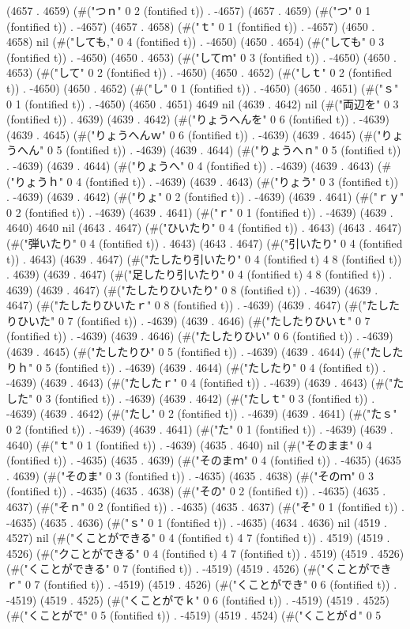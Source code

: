 (4657 . 4659) (#("つｎ" 0 2 (fontified t)) . -4657) (4657 . 4659) (#("つ" 0 1 (fontified t)) . -4657) (4657 . 4658) (#("ｔ" 0 1 (fontified t)) . -4657) (4650 . 4658) nil (#("しても," 0 4 (fontified t)) . -4650) (4650 . 4654) (#("しても" 0 3 (fontified t)) . -4650) (4650 . 4653) (#("してｍ" 0 3 (fontified t)) . -4650) (4650 . 4653) (#("して" 0 2 (fontified t)) . -4650) (4650 . 4652) (#("しｔ" 0 2 (fontified t)) . -4650) (4650 . 4652) (#("し" 0 1 (fontified t)) . -4650) (4650 . 4651) (#("ｓ" 0 1 (fontified t)) . -4650) (4650 . 4651) 4649 nil (4639 . 4642) nil (#("両辺を" 0 3 (fontified t)) . 4639) (4639 . 4642) (#("りょうへんを" 0 6 (fontified t)) . -4639) (4639 . 4645) (#("りょうへんｗ" 0 6 (fontified t)) . -4639) (4639 . 4645) (#("りょうへん" 0 5 (fontified t)) . -4639) (4639 . 4644) (#("りょうへｎ" 0 5 (fontified t)) . -4639) (4639 . 4644) (#("りょうへ" 0 4 (fontified t)) . -4639) (4639 . 4643) (#("りょうｈ" 0 4 (fontified t)) . -4639) (4639 . 4643) (#("りょう" 0 3 (fontified t)) . -4639) (4639 . 4642) (#("りょ" 0 2 (fontified t)) . -4639) (4639 . 4641) (#("ｒｙ" 0 2 (fontified t)) . -4639) (4639 . 4641) (#("ｒ" 0 1 (fontified t)) . -4639) (4639 . 4640) 4640 nil (4643 . 4647) (#("ひいたり" 0 4 (fontified t)) . 4643) (4643 . 4647) (#("弾いたり" 0 4 (fontified t)) . 4643) (4643 . 4647) (#("引いたり" 0 4 (fontified t)) . 4643) (4639 . 4647) (#("たしたり引いたり" 0 4 (fontified t) 4 8 (fontified t)) . 4639) (4639 . 4647) (#("足したり引いたり" 0 4 (fontified t) 4 8 (fontified t)) . 4639) (4639 . 4647) (#("たしたりひいたり" 0 8 (fontified t)) . -4639) (4639 . 4647) (#("たしたりひいたｒ" 0 8 (fontified t)) . -4639) (4639 . 4647) (#("たしたりひいた" 0 7 (fontified t)) . -4639) (4639 . 4646) (#("たしたりひいｔ" 0 7 (fontified t)) . -4639) (4639 . 4646) (#("たしたりひい" 0 6 (fontified t)) . -4639) (4639 . 4645) (#("たしたりひ" 0 5 (fontified t)) . -4639) (4639 . 4644) (#("たしたりｈ" 0 5 (fontified t)) . -4639) (4639 . 4644) (#("たしたり" 0 4 (fontified t)) . -4639) (4639 . 4643) (#("たしたｒ" 0 4 (fontified t)) . -4639) (4639 . 4643) (#("たした" 0 3 (fontified t)) . -4639) (4639 . 4642) (#("たしｔ" 0 3 (fontified t)) . -4639) (4639 . 4642) (#("たし" 0 2 (fontified t)) . -4639) (4639 . 4641) (#("たｓ" 0 2 (fontified t)) . -4639) (4639 . 4641) (#("た" 0 1 (fontified t)) . -4639) (4639 . 4640) (#("ｔ" 0 1 (fontified t)) . -4639) (4635 . 4640) nil (#("そのまま" 0 4 (fontified t)) . -4635) (4635 . 4639) (#("そのまｍ" 0 4 (fontified t)) . -4635) (4635 . 4639) (#("そのま" 0 3 (fontified t)) . -4635) (4635 . 4638) (#("そのｍ" 0 3 (fontified t)) . -4635) (4635 . 4638) (#("その" 0 2 (fontified t)) . -4635) (4635 . 4637) (#("そｎ" 0 2 (fontified t)) . -4635) (4635 . 4637) (#("そ" 0 1 (fontified t)) . -4635) (4635 . 4636) (#("ｓ" 0 1 (fontified t)) . -4635) (4634 . 4636) nil (4519 . 4527) nil (#("くことができる" 0 4 (fontified t) 4 7 (fontified t)) . 4519) (4519 . 4526) (#("クことができる" 0 4 (fontified t) 4 7 (fontified t)) . 4519) (4519 . 4526) (#("くことができる" 0 7 (fontified t)) . -4519) (4519 . 4526) (#("くことができｒ" 0 7 (fontified t)) . -4519) (4519 . 4526) (#("くことができ" 0 6 (fontified t)) . -4519) (4519 . 4525) (#("くことがでｋ" 0 6 (fontified t)) . -4519) (4519 . 4525) (#("くことがで" 0 5 (fontified t)) . -4519) (4519 . 4524) (#("くことがｄ" 0 5 